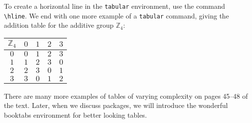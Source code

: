 \documentclass[11pt]{article}
\begin{document}
To create a horizontal line in the \verb~tabular~ environment, use the command
\verb~\hline~.  We end with one more example of a \verb~tabular~ command, giving the
addition table for the additive group $\mathbb{Z}_4$:
\begin{center}
\begin{tabular}{c|cccc}
$\mathbb{Z}_4$ & $0$ & $1$ & $2$ & $3$ \\
\hline 
$0$ & $0$ & $1$ & $2$ & $3$ \\
$1$ & $1$ & $2$ & $3$ & $0$ \\
$2$ & $2$ & $3$ & $0$ & $1$ \\
$3$ & $3$ & $0$ & $1$ & $2$ \\
\end{tabular}
\end{center}
There are many more examples of tables of varying complexity on pages 45--48 
of the text.  Later, when we discuss packages, we will introduce the wonderful booktabs 
environment for better looking tables. 
\end{document}

